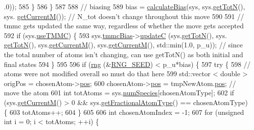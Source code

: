 \begin{DoxyCode}
      .0));
585             \}
586     \}
587 
588         \textcolor{comment}{// biasing}
589         bias = \hyperlink{system_8cpp_acfe185adf03db047fd3753c0d788e0e3}{calculateBias}(sys, sys.\hyperlink{classsim_system_a37dd827f4057049763351510147b9f1d}{getTotN}(), sys.
      \hyperlink{classsim_system_a299fe4372e610b554eaaf5f5957b2dbc}{getCurrentM}()); \textcolor{comment}{// N\_tot doesn't change throughout this move}
590 
591         \textcolor{comment}{// tmmc gets updated the same way, regardless of whether the move gets accepted}
592         \textcolor{keywordflow}{if} (sys.\hyperlink{classsim_system_aa474a50b6353c8897331b1ab1ce53ab1}{useTMMC}) \{
593             sys.\hyperlink{classsim_system_a13173f45a1e40a5f5a3552b0ebe15b54}{tmmcBias}->\hyperlink{classtmmc_ae067afc5b52af203b9d45f18d9737219}{updateC} (sys.\hyperlink{classsim_system_a37dd827f4057049763351510147b9f1d}{getTotN}(), sys.
      \hyperlink{classsim_system_a37dd827f4057049763351510147b9f1d}{getTotN}(), sys.\hyperlink{classsim_system_a299fe4372e610b554eaaf5f5957b2dbc}{getCurrentM}(), sys.\hyperlink{classsim_system_a299fe4372e610b554eaaf5f5957b2dbc}{getCurrentM}(), std::min(1.0, p\_u)); \textcolor{comment}{// since
       the total number of atoms isn't changing, can use getTotN() as both initial and final states}
594     \}
595 
596         \textcolor{keywordflow}{if} (\hyperlink{utilities_8cpp_a0f9542af4b475ac79cb679d7a8d14db0}{rng} (&\hyperlink{global_8h_a3f4e4ea24d5a5c66feae55d1f329c884}{RNG\_SEED}) < p\_u*bias) \{
597             \textcolor{keywordflow}{try} \{
598                     \textcolor{comment}{// atoms were not modified overall so must do that here}
599                     std::vector < double > origPos = chosenAtom->\hyperlink{classatom_a3ae5f4880e7831d8b2c9fda72b4eb24a}{pos};
600                 chosenAtom->\hyperlink{classatom_a3ae5f4880e7831d8b2c9fda72b4eb24a}{pos} = tmpNewAtom.\hyperlink{classatom_a3ae5f4880e7831d8b2c9fda72b4eb24a}{pos}; \textcolor{comment}{// move the atom}
601                     \textcolor{keywordtype}{int} totAtoms = sys.\hyperlink{classsim_system_a9eea865e6dc1cff377b1e79c4d9c23f0}{numSpecies}[chosenAtomType];
602             \textcolor{keywordflow}{if} (sys.\hyperlink{classsim_system_a299fe4372e610b554eaaf5f5957b2dbc}{getCurrentM}() > 0 && sys.\hyperlink{classsim_system_a0500a9e84eecfbde7a98cf8a34f719d5}{getFractionalAtomType}() == 
      chosenAtomType) \{
603                 totAtoms++;
604             \}
605 
606             \textcolor{keywordtype}{int} chosenAtomIndex = -1;
607             \textcolor{keywordflow}{for} (\textcolor{keywordtype}{unsigned} \textcolor{keywordtype}{int} i = 0; i < totAtoms; ++i) \{

\end{DoxyCode}
